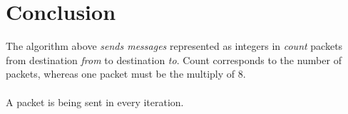 \documentclass{article}
\begin{document}
  \section*{Conclusion}
  The algorithm above \textsl{sends messages} represented as integers in \textsl{count} packets from destination \textsl{from} to destination \textsl{to}.
  Count corresponds to the number of packets, whereas one packet must be the multiply of 8. 
  \\
  \\
  A packet is being sent in every iteration.

 
\end{document}
